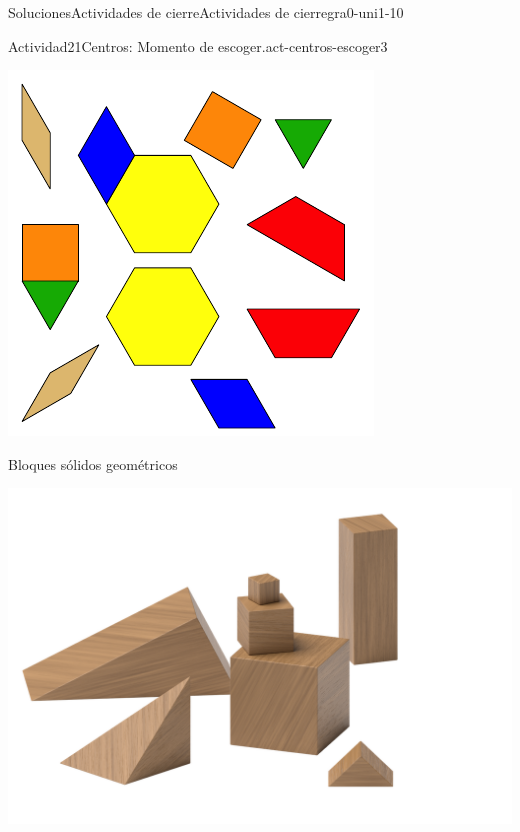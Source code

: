 \documentclass[twoside,10pt,]{article}
\begin{document}
\begin{solutions-section}{Soluciones}{Actividades de cierre}{}{Actividades de cierre}{}{}{gra0-uni1-10}
\begin{activitysolution}{Actividad}{21}{Centros: Momento de escoger.}{act-centros-escoger3}
\begin{sidebyside}{2}{0.025}{0.025}{0.05}
\begin{sbspanel}{0.45}
\includegraphics[width=\linewidth]{external/svg-source/tikz-file-147344.pdf}
\end{sbspanel}%
\end{sidebyside}%
\begin{sidebyside}{2}{0.025}{0.025}{0.05}%
\begin{sbspanel}{0.45}%
Bloques sólidos geométricos%
\par
\includegraphics[width=\linewidth]{external/png-source/K.1.A Beta Student Workbook.Geoblocks.png}
\end{sbspanel}%

\end{sidebyside}
\end{activitysolution}
\end{solutions-section}
\end{document}
